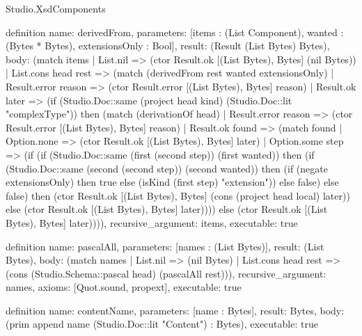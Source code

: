\begin{lexlean}{Studio.XsdComponents}
\begin{semanticmodule}
definition{
  name: derivedFrom,
  parameters: [items : (List Component), wanted : (Bytes * Bytes), extensionsOnly : Bool],
  result: (Result (List Bytes) Bytes),
  body: (match items
    | List.nil => (ctor Result.ok [(List Bytes), Bytes] (nil Bytes))
    | List.cons head rest => (match (derivedFrom rest wanted extensionsOnly)
      | Result.error reason => (ctor Result.error [(List Bytes), Bytes] reason)
      | Result.ok later => (if (Studio.Doc::same (project head kind) (Studio.Doc::lit "complexType")) then (match (derivationOf head)
        | Result.error reason => (ctor Result.error [(List Bytes), Bytes] reason)
        | Result.ok found => (match found
          | Option.none => (ctor Result.ok [(List Bytes), Bytes] later)
          | Option.some step => (if (if (Studio.Doc::same (first (second step)) (first wanted)) then (if (Studio.Doc::same (second (second step)) (second wanted)) then (if (negate extensionsOnly) then true else (isKind (first step) "extension")) else false) else false) then (ctor Result.ok [(List Bytes), Bytes] (cons (project head local) later)) else (ctor Result.ok [(List Bytes), Bytes] later)))) else (ctor Result.ok [(List Bytes), Bytes] later)))),
  recursive_argument: items,
  executable: true
}

definition{
  name: pascalAll,
  parameters: [names : (List Bytes)],
  result: (List Bytes),
  body: (match names
    | List.nil => (nil Bytes)
    | List.cons head rest => (cons (Studio.Schema::pascal head) (pascalAll rest))),
  recursive_argument: names,
  axioms: [Quot.sound, propext],
  executable: true
}

definition{
  name: contentName,
  parameters: [name : Bytes],
  result: Bytes,
  body: (prim append name (Studio.Doc::lit "Content") : Bytes),
  executable: true
}


\end{semanticmodule}
\end{lexlean}
